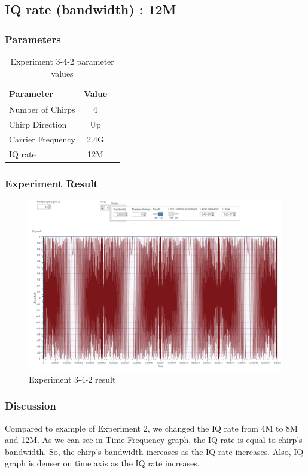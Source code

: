 \subsection{IQ rate (bandwidth) : 12M}
    \subsubsection*{Parameters}
    \begin{table}[!h]\centering
        \hspace{10mm}
        \begin{tabular}{|l|c|c|}
        \hline
        \multicolumn{1}{|l|}{Parameter} & \multicolumn{1}{l|}{Value} \\
        \hline
        Number of Chirps & 4 \\ 
        \hline
        Chirp Direction & Up \\ 
        \hline
        Carrier Frequency & 2.4G \\ 
        \hline
        IQ rate & 12M \\ 
        \hline
        \end{tabular}
        \caption{Experiment 3-4-2 parameter values}
    \end{table}
\clearpage
    \subsubsection*{Experiment Result}
    \vspace{-4mm}  
    \begin{figure}[!h]\raggedleft
    \hspace{15mm}
		\includegraphics[width=.95\textwidth]{image/week03/3-4-2.png}
		\caption{\footnotesize Experiment 3-4-2 result}
		\vspace{-10pt}
    \end{figure}
    
    \subsubsection*{Discussion}
    Compared to example of Experiment 2, we changed the IQ rate from 4M to 8M and 12M. As we can see in Time-Frequency graph, the IQ rate is equal to chirp’s bandwidth. So, the chirp’s bandwidth increases as the IQ rate increases. Also, IQ graph is denser on time axis as the IQ rate increases. \\
\clearpage